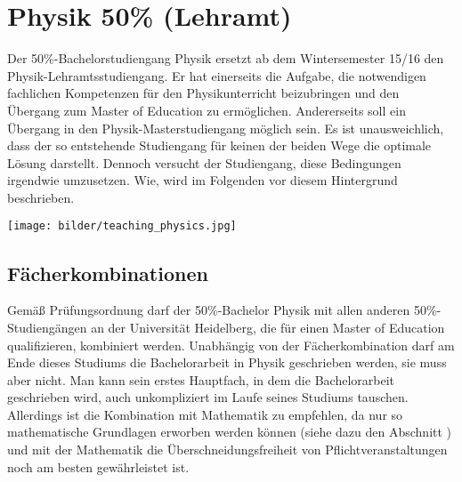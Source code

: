 \section{Physik 50\% (Lehramt)} %

Der 50\%-Bachelorstudiengang Physik ersetzt ab dem Wintersemester 15/16 den Physik-Lehramtsstudiengang. Er hat einerseits die Aufgabe, die notwendigen fachlichen Kompetenzen für den Physikunterricht beizubringen und den Übergang zum Master of Education zu ermöglichen. Andererseits soll ein Übergang in den Physik-Masterstudiengang möglich sein. Es ist unausweichlich, dass der so entstehende Studiengang für keinen der beiden Wege die optimale Lösung darstellt. Dennoch versucht der Studiengang, diese Bedingungen irgendwie umzusetzen. Wie, wird im Folgenden vor diesem Hintergrund beschrieben.

\begin{figure*}[b]
    \centering
    \texttt{[image: bilder/teaching\_physics.jpg]}
\end{figure*}

\subsection{Fächerkombinationen}

Gemäß Prüfungsordnung darf der 50\%-Bachelor Physik mit allen anderen 50\%-Studiengängen an der Universität Heidelberg, die für einen Master of Education qualifizieren, kombiniert werden. Unabhängig von der Fächerkombination darf am Ende dieses Studiums die Bachelorarbeit in Physik geschrieben werden, sie muss aber nicht. Man kann sein erstes Hauptfach, in dem die Bachelorarbeit geschrieben wird, auch unkompliziert im Laufe seines Studiums tauschen. Allerdings ist die Kombination mit Mathematik zu empfehlen, da nur so mathematische Grundlagen erworben werden können (siehe dazu den Abschnitt ) und mit der Mathematik die Überschneidungsfreiheit von Pflichtveranstaltungen noch am besten gewährleistet ist.

